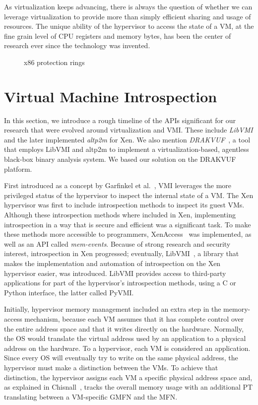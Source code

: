 As virtualization keeps advancing, there is always the question of whether we can leverage virtualization to provide more than simply efficient sharing and usage of resources. The unique ability of the hypervisor to access the state of a \ac{VM}, at the fine grain level of \ac{CPU} registers and memory bytes, has been the center of research ever since the technology was invented. 

\begin{figure}
	\centering
	
	\caption{x86 protection rings}
	\label{fig:rings}
\end{figure}

\section{Virtual Machine Introspection}\label{sec:vmi}
In this section, we introduce a rough timeline of the \acp{API} significant for our research that were evolved around virtualization and \ac{VMI}. These include \emph{LibVMI} and the later implemented \emph{altp2m} for Xen. We also mention \emph{DRAKVUF}~\cite{lengyel2014drakvuf}, a tool that employs LibVMI and altp2m to implement a virtualization-based, agentless black-box binary analysis system. We based our solution on the DRAKVUF platform. 	

\par First introduced as a concept by Garfinkel et al.~\cite{garfinkel2003virtual}, \ac{VMI} leverages the more privileged status of the hypervisor to inspect the internal state of a \ac{VM}. The Xen hypervisor was first to include introspection methods to inspect its guest \ac{VM}s. Although these introspection methods where included in Xen, implementing introspection in a way that is secure and efficient was a significant task. To make these methods more accessible to programmers, XenAccess~\cite{payne2007secure} was implemented, as well as an \ac{API} called \emph{mem-events}. Because of strong research and security interest, introspection in Xen progressed; eventually, LibVMI~\cite{payne2011libvmi}, a library that makes the implementation and automation of introspection on the Xen hypervisor easier, was introduced. LibVMI provides access to third-party applications for part of the hypervisor's introspection methods, using a C or Python interface, the latter called PyVMI. 

\par Initially, hypervisor memory management included an extra step in the memory-access mechanism, because each \ac{VM} assumes that it has complete control over the entire address space and that it writes directly on the hardware. Normally, the \ac{OS} would translate the virtual address used by an application to a physical address on the hardware. To a hypervisor, each \ac{VM} is considered an application. Since every \ac{OS} will eventually try to write on the same physical address, the hypervisor must make a distinction between the \ac{VM}s. To achieve that distinction, the hypervisor assigns each \ac{VM} a specific physical address space and, as explained in Chisnall~\cite{chisnall2008definitive}, tracks the overall memory usage with an additional \ac{PT} translating between a \ac{VM}-specific \ac{GMFN} and the \ac{MFN}.

